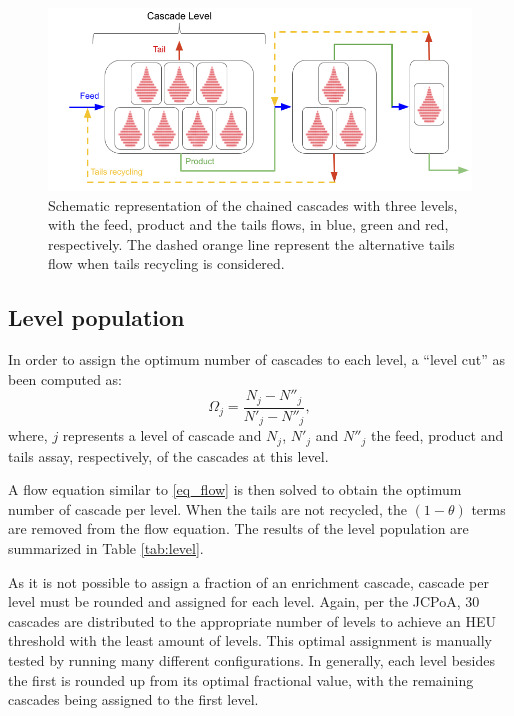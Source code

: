 \begin{figure}[ht] %
    \centering
    \includegraphics[width=\linewidth]{flow}
    \caption{Schematic representation of the chained cascades with three levels,
    with the feed, product and the tails flows, in blue, green and red,
    respectively. The dashed orange line represent the alternative tails flow when
    tails recycling is considered.}
    \label{fig:cascade_level}
\end{figure}


\subsection{Level population}
In order to assign the optimum number of cascades to each level, a ``level cut'' as
been computed as:
\begin{equation}
    \Omega_{j} = \frac{N_{j}-N''_{j}}{N'_{j}-N''_{j}},
\end{equation}
where, $j$ represents a level of cascade and $N_{j}$, $N'_{j}$ and $N''_{j}$
the feed, product and tails assay, respectively, of the cascades at this level.

A flow equation similar to \eqref{eq_flow} is then solved to obtain the optimum
number of cascade per level. When the tails are not recycled, the $(1-\theta)$
terms are removed from the flow equation.  The results of the level population
are summarized in Table \ref{tab:level}.

As it is not possible to assign a fraction of an enrichment cascade, cascade per
level must be rounded and assigned for each level. Again, per the JCPoA, 30
cascades are distributed to the appropriate number of levels to achieve an
HEU threshold with the least amount of levels. This optimal assignment is
manually tested by running many different configurations. In generally, each
level besides the first is rounded up from its optimal fractional value, with
the remaining cascades being assigned to the first level.


